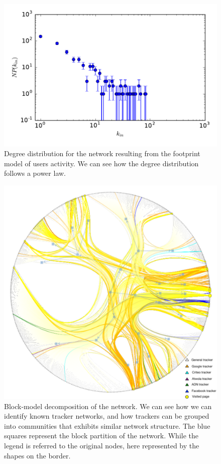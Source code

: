 \begin{figure}
\includegraphics[width=\textwidth]{figures/deg-dist.pdf}
\caption[User activity network degree distribution]{Degree distribution for the network resulting from the footprint model of users activity. We can see how the degree distribution follows a power law.
\label{fig:deg-dist}}
\end{figure}

\begin{figure}
\includegraphics[width=\textwidth]{figures/blockmodel.pdf}
\caption[Blockmodel decomposition of the tracker network]{Block-model decomposition of the network. We can see how we can identify known tracker networks, and how trackers can be grouped into communities that exhibits similar network structure. The blue squares represent the block partition of the network. While the legend is referred to the original nodes, here represented by the shapes on the border.
\label{fig:blockmodel}}
\end{figure}

